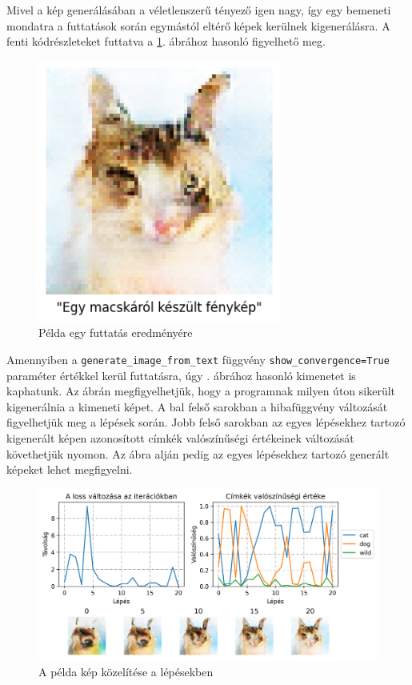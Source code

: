 Mivel a kép generálásában a véletlenszerű tényező igen nagy, így egy bemeneti mondatra a futtatások során egymástól eltérő képek kerülnek kigenerálásra. A fenti kódrészleteket futtatva a \ref{fig:demo}. ábrához hasonló figyelhető meg.

\begin{figure}[h]
	\centering
	\includegraphics[width=8cm]{images/demo01.png}
	\caption{Példa egy futtatás eredményére}
	\label{fig:demo}
\end{figure}

Amennyiben a \texttt{generate\_image\_from\_text} függvény \texttt{show\_convergence=True} paraméter értékkel kerül futtatásra, úgy . ábrához hasonló kimenetet is kaphatunk. Az ábrán megfigyelhetjük, hogy a programnak milyen úton sikerült kigenerálnia a kimeneti képet. A bal felső sarokban a hibafüggvény változását figyelhetjük meg a lépések során. Jobb felső sarokban az egyes lépésekhez tartozó kigenerált képen azonosított címkék valószínűségi értékeinek változását követhetjük nyomon. Az ábra alján pedig az egyes lépésekhez tartozó generált képeket lehet megfigyelni.

\begin{figure}[h]
	\centering
	\includegraphics[width=\textwidth]{images/demo01_conv.png}
	\caption{A példa kép közelítése a lépésekben}
	\label{fig:demo_convergence}
\end{figure}


